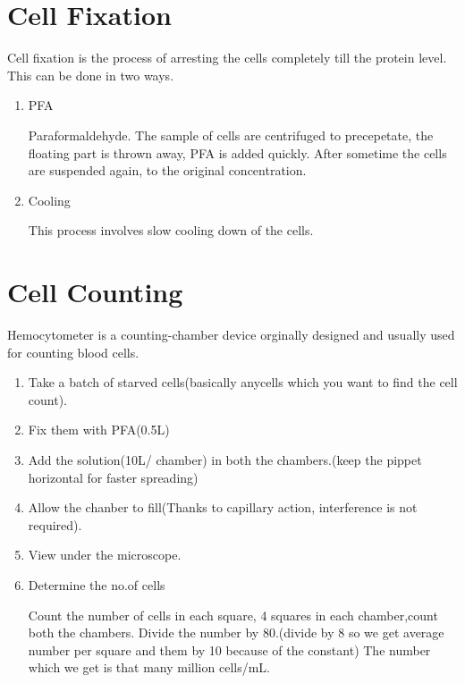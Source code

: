 \documentclass[11pt,twoside,a4paper]{article}
\begin{document}
\section{Cell Fixation}
Cell fixation is the process of arresting the cells completely till the protein level. This can be done in two ways.
\begin{enumerate}
	\item PFA

		Paraformaldehyde. The sample of cells are centrifuged to precepetate, the floating part is thrown away, PFA is added quickly. After sometime the cells are suspended again, to the original concentration.
	\item Cooling

		This process involves slow cooling down of the cells.
\end{enumerate}

\section{Cell Counting}
Hemocytometer is a counting-chamber device orginally designed and usually used for counting blood cells.
\begin{enumerate}
	\item Take a batch of starved cells(basically anycells which you want to find the cell count).
	\item Fix them with PFA(0.5\textmu{}L)
	\item Add the solution(10\textmu{}L/ chamber) in both the chambers.(keep the pippet horizontal for faster spreading)
	\item Allow the chanber to fill(Thanks to capillary action, interference is not required).
	\item View under the microscope.
	\item Determine the no.of cells

		Count the number of cells in each square, 4 squares in each chamber,count both the chambers.
		Divide the number by 80.(divide by 8 so we get average number per square and them by 10 because of the constant)
		The number which we get is that many million cells/mL.
\end{enumerate}
\end{document}
